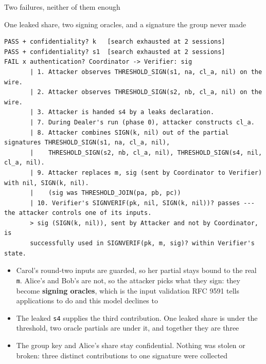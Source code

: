 \ifdefined\PRESENTATION\else\PassOptionsToClass{handout}{beamer}\fi\documentclass[aspectratio=169, lualatex]{beamer}
\newcommand{\vpcode}{\fontsize{6}{6.4}\selectfont\ttfamily\color{vpink}}
\begin{document}
\begin{frame}[fragile]{Two failures, neither of them enough}
	\begin{vpresult}[top=0.5mm, bottom=0.5mm]{One leaked share, two signing oracles, and a signature the group never made}
		\begin{lstlisting}[basicstyle=\vpcode]
PASS + confidentiality? k   [search exhausted at 2 sessions]
PASS + confidentiality? s1  [search exhausted at 2 sessions]
FAIL x authentication? Coordinator -> Verifier: sig
       | 1. Attacker observes THRESHOLD_SIGN(s1, na, cl_a, nil) on the wire.
       | 2. Attacker observes THRESHOLD_SIGN(s2, nb, cl_a, nil) on the wire.
       | 3. Attacker is handed s4 by a leaks declaration.
       | 7. During Dealer's run (phase 0), attacker constructs cl_a.
       | 8. Attacker combines SIGN(k, nil) out of the partial signatures THRESHOLD_SIGN(s1, na, cl_a, nil),
       |    THRESHOLD_SIGN(s2, nb, cl_a, nil), THRESHOLD_SIGN(s4, nil, cl_a, nil).
       | 9. Attacker replaces m, sig (sent by Coordinator to Verifier) with nil, SIGN(k, nil).
       |    (sig was THRESHOLD_JOIN(pa, pb, pc))
       | 10. Verifier's SIGNVERIF(pk, nil, SIGN(k, nil))? passes --- the attacker controls one of its inputs.
       > sig (SIGN(k, nil)), sent by Attacker and not by Coordinator, is
       successfully used in SIGNVERIF(pk, m, sig)? within Verifier's state.
\end{lstlisting}
	\end{vpresult}
	\scriptsize
	\begin{itemize}
		\item Carol's round-two inputs are guarded, so her partial stays bound to the real \texttt{m}. Alice's and Bob's are not, so the attacker picks what they sign: they become \textbf{signing oracles}, which is the input validation RFC 9591 tells applications to do and this model declines to
		\item The leaked \texttt{s4} supplies the third contribution. One leaked share is under the threshold, two oracle partials are under it, and together they are three
		\item The group key and Alice's share stay confidential. Nothing was stolen or broken: three distinct contributions to one signature were collected
	\end{itemize}
\end{frame}
\end{document}
